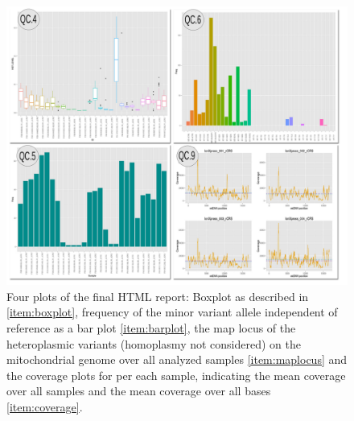 \begin{figure}[!ht]
    \centering
    \includegraphics[width=1\textwidth]{images/mtdna-server-plots.png}
    \caption[Plots of the final HTML report]{Four plots of the final HTML report: Boxplot as described in \ref{item:boxplot}, frequency of the minor variant allele independent of reference as a bar plot \ref{item:barplot}, the map locus of the heteroplasmic variants (homoplasmy not considered) on the mitochondrial genome over all analyzed samples \ref{item:maplocus} and the coverage plots for per each sample, indicating the mean coverage over all samples and the mean coverage over all bases \ref{item:coverage}.}
    \label{fig:mtdna-server-plots}
\end{figure}
